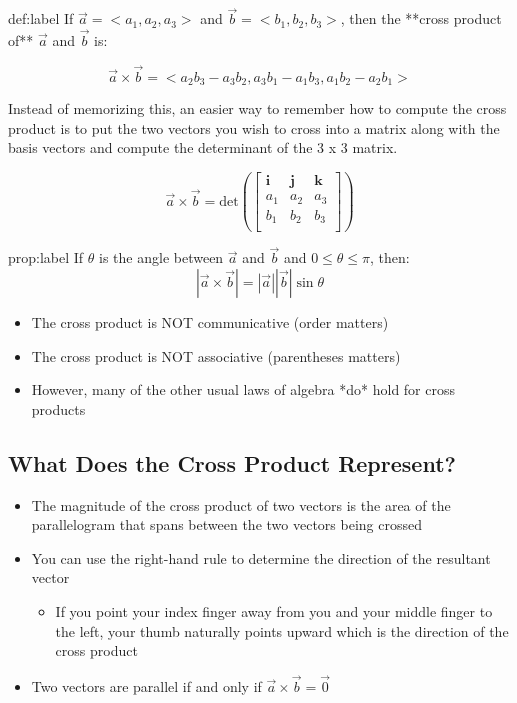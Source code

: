 \documentclass{package/notes}
\begin{document}
\begin{definition}{def:label}
	If $\vec a = <a_1,a_2,a_3>$ and $\vec b = <b_1,b_2,b_3>$, then the **cross product of** $\vec a$ and $\vec b$ is:

	$$\vec a \times \vec b = <a_2b_3 - a_3b_2, a_3b_1-a_1b_3, a_1b_2 - a_2b_1>$$

	Instead of memorizing this, an easier way to remember how to compute the cross product is to put the two vectors you wish to cross into a matrix along with the basis vectors and compute the determinant of the 3 x 3 matrix.

	$$
	\vec a \times \vec b = \text{det}\left(\left[
	\begin{array}{ccc}
		\mathbf i & \mathbf j & \mathbf k\\
		a_1 & a_2 & a_3 \\
		b_1 & b_2 & b_3 \\
	\end{array}
	\right]\right)
	$$
\end{definition}

\begin{proposition}{prop:label}
	If $\theta$ is the angle between $\vec a$ and $\vec b$ and $0\le\theta\le\pi$, then:
	$$|\vec a \times \vec b | = |\vec a||\vec b| \sin\theta$$
\end{proposition}

\begin{itemize}
	\item The cross product is NOT communicative (order matters)
	\item The cross product is NOT associative (parentheses matters)
	\item However, many of the other usual laws of algebra *do* hold for cross products
\end{itemize}

\subsection{What Does the Cross Product Represent?}

\begin{itemize}
	\item The magnitude of the cross product of two vectors is the area of the parallelogram that spans between the two vectors being crossed
	\item You can use the right-hand rule to determine the direction of the resultant vector
	\begin{itemize}
		\item If you point your index finger away from you and your middle finger to the left, your thumb  naturally points upward which is the direction of the cross product
	\end{itemize}
	\item Two vectors are parallel if and only if $\vec a \times \vec b = \vec 0$ 
\end{itemize}
\end{document}
